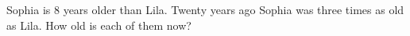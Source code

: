 Sophia is $8$ years older than Lila. Twenty years ago Sophia was three times as old as Lila. How old is each of them now?
